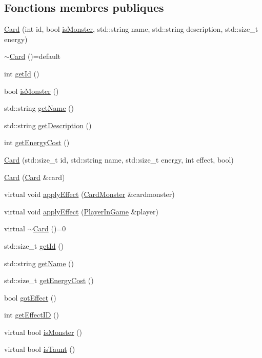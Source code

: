 \subsection*{Fonctions membres publiques}
\begin{DoxyCompactItemize}
\item 
\hyperlink{classCard_af144dc4147acbd1e97031221ad6f3f03}{Card} (int id, bool \hyperlink{classCard_a41da498b0822b35dcbb69293851b39fc}{is\+Monster}, std\+::string name, std\+::string description, std\+::size\+\_\+t energy)
\item 
\hyperlink{classCard_a2914c3978ed065d99ec335bc6788e060}{$\sim$\+Card} ()=default
\item 
int \hyperlink{classCard_a017122109ae10b3c0cce6b267f323414}{get\+Id} ()
\item 
bool \hyperlink{classCard_a41da498b0822b35dcbb69293851b39fc}{is\+Monster} ()
\item 
std\+::string \hyperlink{classCard_ad060fe107bfaf4741c671615885b314a}{get\+Name} ()
\item 
std\+::string \hyperlink{classCard_a9ffcf78c4078240a1c454f972420e5ba}{get\+Description} ()
\item 
int \hyperlink{classCard_a8e4e806367f17a15673abf8b9aea9503}{get\+Energy\+Cost} ()
\item 
\hyperlink{classCard_a5a1f6635176ec49f837327b1f849e979}{Card} (std\+::size\+\_\+t id, std\+::string name, std\+::size\+\_\+t energy, int effect, bool)
\item 
\hyperlink{classCard_a88211ebea56b896a7f43b8aa600cb74e}{Card} (\hyperlink{classCard}{Card} \&card)
\item 
virtual void \hyperlink{classCard_af0a0d8d7c477b09c5adecdd57db84c0c}{apply\+Effect} (\hyperlink{classCardMonster}{Card\+Monster} \&cardmonster)
\item 
virtual void \hyperlink{classCard_add526d506b074687e3940cda6d3e6d80}{apply\+Effect} (\hyperlink{classPlayerInGame}{Player\+In\+Game} \&player)
\item 
virtual \hyperlink{classCard_a79e6800c90dc22618f1c03247c7f19d5}{$\sim$\+Card} ()=0
\item 
std\+::size\+\_\+t \hyperlink{classCard_a6eec742565ded028a7f2737c53ae4507}{get\+Id} ()
\item 
std\+::string \hyperlink{classCard_ad060fe107bfaf4741c671615885b314a}{get\+Name} ()
\item 
std\+::size\+\_\+t \hyperlink{classCard_a56f0050aa1cbc799b4481431163f5a90}{get\+Energy\+Cost} ()
\item 
bool \hyperlink{classCard_a9932401135454db169e1e4d678103917}{got\+Effect} ()
\item 
int \hyperlink{classCard_a6f6c3220c269eef98fe84ffbcffd9371}{get\+Effect\+I\+D} ()
\item 
virtual bool \hyperlink{classCard_a75c94d383b9710efb023de601b7103c5}{is\+Monster} ()
\item 
virtual bool \hyperlink{classCard_ae68d1105abd6827736e759add5c1651f}{is\+Taunt} ()
\end{DoxyCompactItemize}


